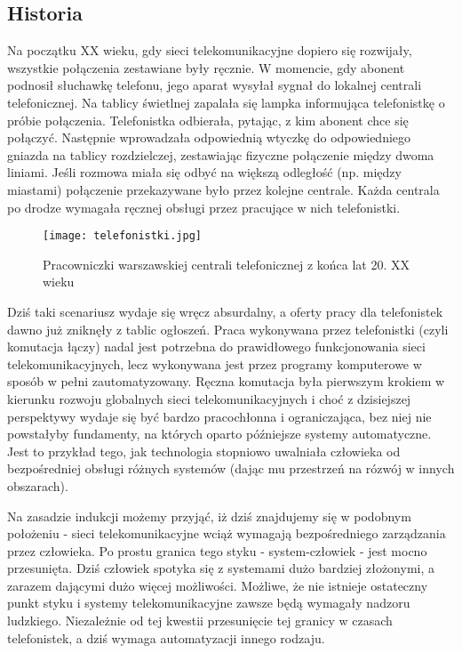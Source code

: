 \subsection{Historia}

Na początku XX wieku, gdy sieci telekomunikacyjne dopiero się rozwijały, wszystkie połączenia zestawiane były ręcznie. W momencie, gdy abonent podnosił słuchawkę telefonu, jego aparat wysyłał sygnał do lokalnej centrali telefonicznej. Na tablicy świetlnej zapalała się lampka informująca telefonistkę o próbie połączenia. Telefonistka odbierała, pytając, z kim abonent chce się połączyć. Następnie wprowadzała odpowiednią wtyczkę do odpowiedniego gniazda na tablicy rozdzielczej, zestawiając fizyczne połączenie między dwoma liniami. Jeśli rozmowa miała się odbyć na większą odległość (np. między miastami) połączenie przekazywane było przez kolejne centrale. Każda centrala po drodze wymagała ręcznej obsługi przez pracujące w nich telefonistki. 

\begin{figure}[!h]
    \centering \texttt{[image: telefonistki.jpg]}
    \caption{Pracowniczki warszawskiej centrali telefonicznej z końca lat 20. XX wieku}\label{fig:telefonistki}
\end{figure}

Dziś taki scenariusz wydaje się wręcz absurdalny, a oferty pracy dla telefonistek dawno już zniknęły z tablic ogłoszeń. Praca wykonywana przez telefonistki (czyli komutacja łączy) nadal jest potrzebna do prawidłowego funkcjonowania sieci telekomunikacyjnych, lecz wykonywana jest przez programy komputerowe w sposób w pełni zautomatyzowany. Ręczna komutacja była pierwszym krokiem w kierunku rozwoju globalnych sieci telekomunikacyjnych i choć z dzisiejszej perspektywy wydaje się być bardzo pracochłonna i ograniczająca, bez niej nie powstałyby fundamenty, na których oparto późniejsze systemy automatyczne. Jest to przykład tego, jak technologia stopniowo uwalniała człowieka od bezpośredniej obsługi różnych systemów (dając mu przestrzeń na rózwój w innych obszarach). 

Na zasadzie indukcji możemy przyjąć, iż dziś znajdujemy się w podobnym położeniu - sieci telekomunikacyjne wciąż wymagają bezpośredniego zarządzania przez człowieka. Po prostu granica tego styku - system-człowiek - jest mocno przesunięta. Dziś człowiek spotyka się z systemami dużo bardziej złożonymi, a zarazem dającymi dużo więcej możliwości. Możliwe, że nie istnieje ostateczny punkt styku i systemy telekomunikacyjne zawsze będą wymagały nadzoru ludzkiego. Niezależnie od tej kwestii przesunięcie tej granicy w czasach telefonistek, a dziś wymaga automatyzacji innego rodzaju. 

